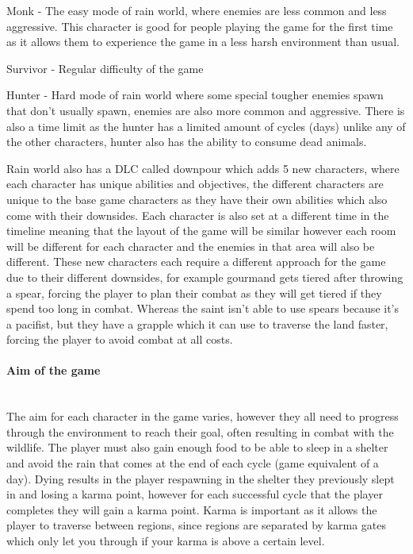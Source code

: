 \documentclass{article}
\newcommand{\parBr}{\vspace{5mm}}%
\newcommand{\myparagraph}[1]{\paragraph{#1}\mbox{}\\} %
\begin{document}
\parBr

Monk - The easy mode of rain world, where enemies are less common and less aggressive. This character is good for people playing the game for the first time as it allows them to experience the game in a less harsh environment than usual.

\parBr

Survivor - Regular difficulty of the game

\parBr

Hunter - Hard mode of rain world where some special tougher enemies spawn that don't usually spawn, enemies are also more common and aggressive. There is also a time limit as the hunter has a limited amount of cycles (days) unlike any of the other characters, hunter also has the ability to consume dead animals.

\parBr

Rain world also has a DLC called downpour which adds 5 new characters, where each character has unique abilities and objectives, the different characters are unique to the base game characters as they have their own abilities which also come with their downsides. Each character is also set at a different time in the timeline meaning that the layout of the game will be similar however each room will be different for each character and the enemies in that area will also be different. These new characters each require a different approach for the game due to their different downsides, for example gourmand gets tiered after throwing a spear, forcing the player to plan their combat as they will get tiered if they spend too long in combat. Whereas the saint isn't able to use spears because it's a pacifist, but they have a grapple which it can use to traverse the land faster, forcing the player to avoid combat at all costs. 

\myparagraph{Aim of the game}
The aim for each character in the game varies, however they all need to progress through the environment to reach their goal, often resulting in combat with the wildlife. The player must also gain enough food to be able to sleep in a shelter and avoid the rain that comes at the end of each cycle (game equivalent of a day). Dying results in the player respawning in the shelter they previously slept in and losing a karma point, however for each successful cycle that the player completes they will gain a karma point. Karma is important as it allows the player to traverse between regions, since regions are separated by karma gates which only let you through if your karma is above a certain level. 
\end{document}
